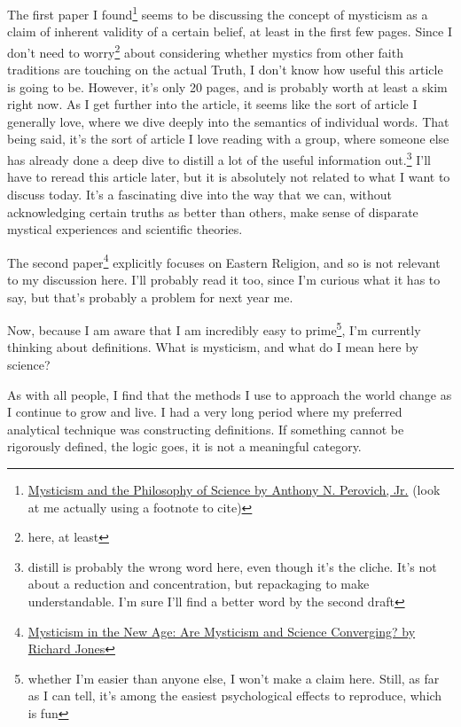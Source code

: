 \documentclass[12pt]{article}[titlepage]
\renewcommand{\,}{\textsuperscript{,}}
\begin{document}
The first paper I found\footnote{\href{https://www.jstor.org/stable/1203270}{Mysticism and the Philosophy of Science by Anthony N. Perovich, Jr.} (look at me actually using a footnote to cite)} seems to be discussing the concept of mysticism as a claim of inherent validity of a certain belief, at least in the first few pages.
Since I don't need to worry\footnote{here, at least} about considering whether mystics from other faith traditions are touching on the actual Truth, I don't know how useful this article is going to be.
However, it's only 20 pages, and is probably worth at least a skim right now.
As I get further into the article, it seems like the sort of article I generally love, where we dive deeply into the semantics of individual words.
That being said, it's the sort of article I love reading with a group, where someone else has already done a deep dive to distill a lot of the useful information out.\footnote{distill is probably the wrong word here, even though it's the cliche. It's not about a reduction and concentration, but repackaging to make understandable.
I'm sure I'll find a better word by the second draft}
I'll have to reread this article later, but it is absolutely not related to what I want to discuss today.
It's a fascinating dive into the way that we can, without acknowledging certain truths as better than others, make sense of disparate mystical experiences and scientific theories.

The second paper\footnote{\href{https://www.academia.edu/download/101343293/RHJ_New_Age_M_S_.pdf}{Mysticism in the New Age: Are Mysticism and Science Converging? by Richard Jones}} explicitly focuses on Eastern Religion, and so is not relevant to my discussion here.
I'll probably read it too, since I'm curious what it has to say, but that's probably a problem for next year me.

Now, because I am aware that I am incredibly easy to prime\footnote{whether I'm easier than anyone else, I won't make a claim here. Still, as far as I can tell, it's among the easiest psychological effects to reproduce, which is fun}, I'm currently thinking about definitions.
What is mysticism, and what do I mean here by science?

As with all people, I find that the methods I use to approach the world change as I continue to grow and live.
I had a very long period where my preferred analytical technique was constructing definitions.
If something cannot be rigorously defined, the logic goes, it is not a meaningful category.
\end{document}
